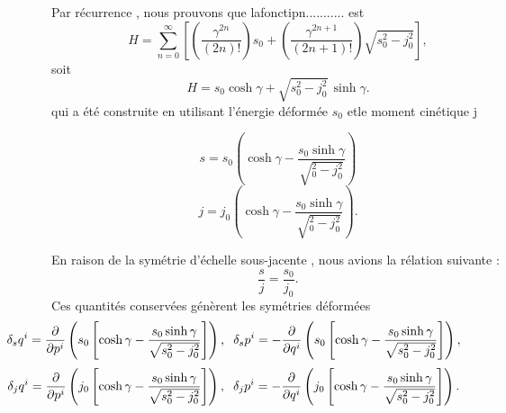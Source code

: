 \documentclass[12pt,a4paper, openany]{article}
\begin{document}
 Par récurrence , nous prouvons que lafonctipn........... est 
 \begin{equation}
 	H=\sum_{n=0}^{\infty}\left[\left(\frac{\gamma^{2n}}{(2n)!}\right)s_0+\left(\frac{\gamma^{2n+1	}}{(2n+1)!}\right)\sqrt{s^2_0-j_0^2}\right] ,
 \end{equation}
 soit
 \begin{equation}
 	 H=s_0\cosh{\gamma}+\sqrt{s^2_0-j_0^2}\,\sinh{\gamma}.
 \end{equation} 
 qui a été construite en utilisant l'énergie déformée $s_0$ etle moment cinétique j 
 \begin{center}
 	\begin{equation}
 		s=s_0\left(\cosh{\gamma}-\frac{s_0\sinh{\gamma}}{\sqrt{^2_0-j_0^2}}\right)
 	\end{equation}
 \begin{equation}
 	j=j_0\left(\cosh{\gamma}-\frac{s_0\sinh{\gamma}}{\sqrt{^2_0-j_0^2}}\right).
 \end{equation}
\end{center}
 En raison de la symétrie d'échelle sous-jacente , nous avions la rélation suivante :
  \begin{equation}
 	\frac{s}{j}=\frac{s_0}{j_0} .
 \end{equation}
 Ces quantités conservées génèrent les symétries déformées 
 \begin{equation}
 \hspace{-2.5cm}\delta_{s}q^i=\frac{\partial}{\partial p^i}\left(s_0\left[\cosh{\gamma}-\frac{s_0\sinh{\gamma}}{\sqrt{s^2_0-j_0^2}}\right]
 	\right),\hspace{0.2cm}\delta_{s}p^i=-\frac{\partial}{\partial q^i}\left(s_0\left[\cosh{\gamma}-\frac{s_0\sinh{\gamma}}{\sqrt{s^2_0-j_0^2}}\right]\right),
 \end{equation}
 \begin{equation}
 	\hspace{-2.5cm}\delta_{j}q^i=\frac{\partial}{\partial p^i}\left(j_0\left[\cosh{\gamma}-\frac{s_0\sinh{\gamma}}{\sqrt{s^2_0-j_0^2}}\right]\right),\hspace{0.2cm}\delta_{j}p^i=-\frac{\partial}{\partial q^i}\left(j_0\left[\cosh{\gamma}-\frac{s_0\sinh{\gamma}}{\sqrt{s^2_0-j_0^2}}\right]\right).
 \end{equation}
 
\end{document}
